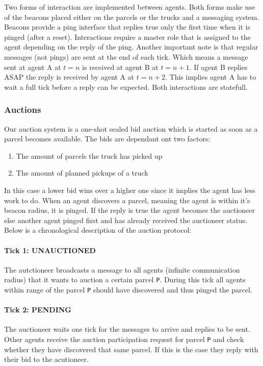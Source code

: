 \documentclass[../main.tex]{subfiles}
\begin{document}
Two forms of interaction are implemented between agents.
Both forms make use of the beacons placed either on the parcels or the trucks and a messaging system.
Beacons provide a ping interface that replies true only the first time when it is pinged (after a reset).
Interactions require a master role that is assigned to the agent depending on the reply of the ping.
Another important note is that regular messages (not pings) are sent at the end of each tick.
Which means a message sent at agent A at $t=n$ is received at agent B at $t=n+1$.
If agent B replies ASAP the reply is received by agent A at $t=n+2$.
This implies agent A has to wait a full tick before a reply can be expected.
Both interactions are statefull.

\subsubsection{Auctions}

Our auction system is a one-shot sealed bid auction which is started as soon as a parcel becomes available.
The bids are dependant ont two factors:
\begin{enumerate}
	\item The amount of parcels the truck has picked up
	\item The amount of planned pickups of a truck
\end{enumerate}
In this case a lower bid wins over a higher one since it implies the agent has less work to do.
When an agent discovers a parcel, meaning the agent is within it's beacon radius, it is pinged.
If the reply is true the agent becomes the auctioneer else another agent pinged first and has already received the auctioneer status.
Below is a chronological description of the auction protocol:

\paragraph{Tick 1: UNAUCTIONED}
The autctioneer broadcasts a message to all agents (infinite communication radius) that it wants to auction a certain parcel \texttt{P}.
During this tick all agents within range of the parcel \texttt{P} should have discovered and thus pinged the parcel.
\paragraph{Tick 2: PENDING}
The auctioneer waits one tick for the messages to arrive and replies to be sent.
Other agents receive the auction participation request for parcel \texttt{P} and check whether they have discovered that same parcel.
If this is the case they reply with their bid to the acutioneer.
\end{document}
